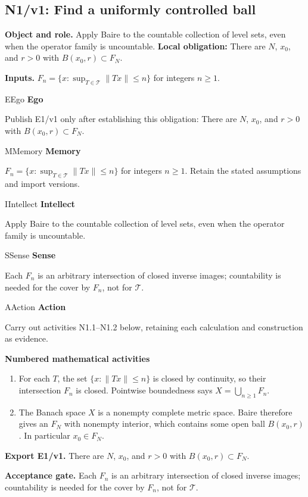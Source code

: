 \documentclass[preprint,12pt,aps,pra,showkeys,amsmath,amssymb,superscriptaddress,floatfix]{revtex4-2}
\theoremstyle{definition}
\theoremstyle{remark}
\newcommand{\mmfaculty}[3]{%
 \begin{mmfacultybox}{#1}{#2}
 {\sffamily\bfseries\color{MMBlue}#2}\par\smallskip #3
 \end{mmfacultybox}}
\newcommand{\field}[2]{\par\smallskip\noindent\textbf{#1.} #2\par}
\begin{document}
\subsection{N1/v1: Find a uniformly controlled ball}

\field{Object and role}{Apply Baire to the countable collection of level sets, even when the
operator family is uncountable. \textbf{Local obligation:} There are
\(N\), \(x_0\), and \(r>0\) with \(B(x_0,r)\subset F_N\).}

\field{Inputs}{\(F_n=\{x:\sup_{T\in\mathcal T}\|Tx\|\le n\}\) for integers \(n\ge1\).}

\mmfaculty{E}{Ego}{Publish E1/v1 only after establishing this obligation: There are \(N\),
\(x_0\), and \(r>0\) with \(B(x_0,r)\subset F_N\).}

\mmfaculty{M}{Memory}{\(F_n=\{x:\sup_{T\in\mathcal T}\|Tx\|\le n\}\) for integers \(n\ge1\).
Retain the stated assumptions and import versions.}

\mmfaculty{I}{Intellect}{Apply Baire to the countable collection of level sets, even when the
operator family is uncountable.}

\mmfaculty{S}{Sense}{Each \(F_n\) is an arbitrary intersection of closed inverse images;
countability is needed for the cover by \(F_n\), not for \(\mathcal T\).}

\mmfaculty{A}{Action}{Carry out activities N1.1--N1.2 below, retaining each calculation and
construction as evidence.}

\smallskip\noindent\textbf{Numbered mathematical activities}

\begin{enumerate}[label=N1.\arabic*,leftmargin=3.4em]

\item For each \(T\), the set \(\{x:\|Tx\|\le n\}\) is closed by continuity,
so their intersection \(F_n\) is closed. Pointwise boundedness says
\(X=\bigcup_{n\ge1}F_n\).

\item The Banach space \(X\) is a nonempty complete metric space. Baire
therefore gives an \(F_N\) with nonempty interior, which contains some
open ball \(B(x_0,r)\). In particular \(x_0\in F_N\).

\end{enumerate}

\field{Export E1/v1}{There are \(N\), \(x_0\), and \(r>0\) with \(B(x_0,r)\subset F_N\).}

\field{Acceptance gate}{Each \(F_n\) is an arbitrary intersection of closed inverse images;
countability is needed for the cover by \(F_n\), not for \(\mathcal T\).}
\end{document}
